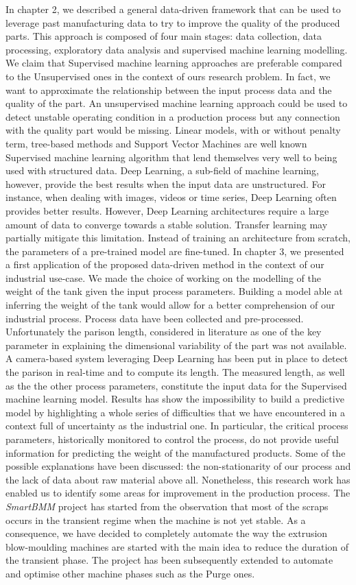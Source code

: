 In chapter 2, we described a general data-driven framework that can be used to leverage past manufacturing data to try to improve the quality of the produced parts. This approach is composed of four main stages: data collection, data processing, exploratory data analysis and supervised machine learning modelling. We claim that Supervised machine learning approaches are preferable compared to the Unsupervised ones in the context of ours research problem. In fact, we want to approximate the relationship between the input process data and the quality of the part. An unsupervised machine learning approach could be used to detect unstable operating condition in a production process but any connection with the quality part would be missing. Linear models, with or without penalty term, tree-based methods and Support Vector Machines are well known Supervised machine learning algorithm that lend themselves very well to being used with structured data. Deep Learning, a sub-field of machine learning, however, provide the best results when the input data are unstructured. For instance, when dealing with images, videos or time series, Deep Learning often provides better results. However, Deep Learning architectures require a large amount of data to converge towards a stable solution. Transfer learning may partially mitigate this limitation. Instead of training an architecture from scratch, the parameters of a pre-trained model are fine-tuned. 
In chapter 3, we presented a first application of the proposed data-driven method in the context of our industrial use-case. We made the choice of working on the modelling of the weight of the tank given the input process parameters. Building a model able at inferring the weight of the tank would allow for a better comprehension of our industrial process. Process data have been collected and pre-processed. Unfortunately the parison length, considered in literature as one of the key parameter in explaining the dimensional variability of the part was not available. A camera-based system leveraging Deep Learning has been put in place to detect the parison in real-time and to compute its length. The measured length, as well as the the other process parameters, constitute the input data for the Supervised machine learning model. Results has show the impossibility to build a predictive model by highlighting a whole series of difficulties that we have encountered in a context full of uncertainty as the industrial one. In particular, the critical process parameters, historically monitored to control the process, do not provide useful information for predicting the weight of the manufactured products. Some of the possible explanations have been discussed: the non-stationarity of our process and the lack of data about raw material above all. Nonetheless, this research work has enabled us to identify some areas for improvement in the production process. The \textit{SmartBMM} project has started from the observation that most of the scraps occurs in the transient regime when the machine is not yet stable. As a consequence, we have decided to completely automate the way the extrusion blow-moulding machines are started with the main idea to reduce the duration of the transient phase. The project has been subsequently extended to automate and optimise other machine phases such as the Purge ones.
